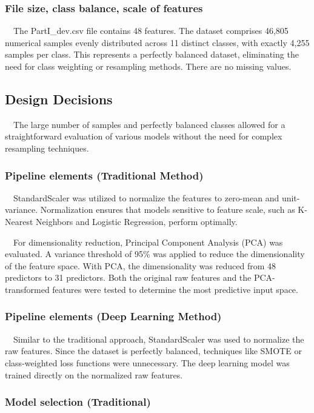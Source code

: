 \documentclass[12pt]{article}
\begin{document}
\subsubsection{File size, class balance, scale of features}

\ \ The PartI\_dev.csv file contains 48 features. The dataset comprises 46,805 numerical samples evenly distributed across 11 distinct classes, with exactly 4,255 samples per class. This represents a perfectly balanced dataset, eliminating the need for class weighting or resampling methods. There are no missing values.


\subsection{Design Decisions}
\ \ The large number of samples and perfectly balanced classes allowed for a straightforward evaluation of various models without the need for complex resampling techniques.

\subsubsection{Pipeline elements (Traditional Method)}

\ \ StandardScaler was utilized to normalize the features to zero-mean and unit-variance. Normalization ensures that models sensitive to feature scale, such as K-Nearest Neighbors and Logistic Regression, perform optimally.

\ \ For dimensionality reduction, Principal Component Analysis (PCA) was evaluated. A variance threshold of 95\% was applied to reduce the dimensionality of the feature space. With PCA, the dimensionality was reduced from 48 predictors to 31 predictors. Both the original raw features and the PCA-transformed features were tested to determine the most predictive input space.

\subsubsection{Pipeline elements (Deep Learning Method)}

\ \ Similar to the traditional approach, StandardScaler was used to normalize the raw features. Since the dataset is perfectly balanced, techniques like SMOTE or class-weighted loss functions were unnecessary. The deep learning model was trained directly on the normalized raw features.

\subsubsection{Model selection (Traditional)}
\end{document}
